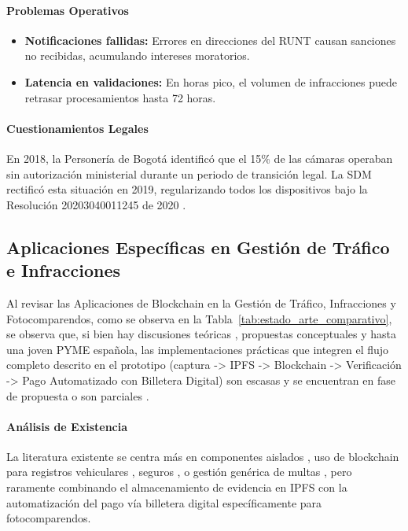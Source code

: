 \paragraph{Problemas Operativos }
\begin{itemize}
    \item \textbf{Notificaciones fallidas: }Errores en direcciones del RUNT causan sanciones no recibidas, acumulando intereses moratorios. 
    \item \textbf{Latencia en validaciones:  }En horas pico, el volumen de infracciones puede retrasar procesamientos hasta 72 horas.
\end{itemize}

\paragraph{Cuestionamientos Legales }
En 2018, la Personería de Bogotá identificó que el 15\% de las cámaras operaban sin autorización ministerial durante un periodo de transición legal. La SDM rectificó esta situación en 2019, regularizando todos los dispositivos bajo la Resolución 20203040011245 de 2020 \parencite{secretaria_movilidad2023}. 

\subsection{Aplicaciones Específicas en Gestión de Tráfico e Infracciones} 

Al revisar las Aplicaciones de Blockchain en la Gestión de Tráfico, Infracciones y Fotocomparendos, como se observa en la Tabla~\ref{tab:estado_arte_comparativo}, se observa que, si bien hay discusiones teóricas \parencite{yousfi2022its}, propuestas conceptuales \parencite{chen2024blockchain} y hasta una joven PYME española, las implementaciones prácticas que integren el flujo completo descrito en el prototipo (captura -> IPFS -> Blockchain -> Verificación -> Pago Automatizado con Billetera Digital) son escasas y se encuentran en fase de propuesta o son parciales \parencite{omar2024srtm,choquevilca2024blockchain}.

 

\paragraph{Análisis de Existencia}
La literatura existente se centra más en componentes aislados \parencite{yousfi2022its}, uso de blockchain para registros vehiculares \parencite{mani2023smart}, seguros \parencite{dutta2023solution}, o gestión genérica de multas \parencite{omar2024srtm}, pero raramente combinando el almacenamiento de evidencia en IPFS con la automatización del pago vía billetera digital específicamente para fotocomparendos.

